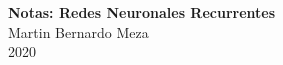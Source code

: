 \documentclass[11pt]{article}
\begin{document}
\setmainfont{Carlito}

\thispagestyle{empty}

\begin{center}
{\LARGE \bf Notas: Redes Neuronales Recurrentes}\\
{\large Martin Bernardo Meza}\\
2020
\end{center}


\newpage
\end{document}

